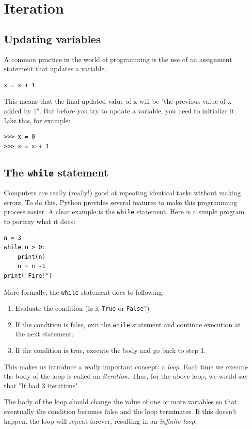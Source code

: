 \section{Iteration}
\subsection{Updating variables}
A common practice in the world of programming is the use of an assignment statement that updates a variable.
\begin{verbatim}
x = x + 1
\end{verbatim}

This means that the final updated value of x will be "the previous value of x added by 1". But before you try to update a variable, you need to initialize it. Like this, for example:
\begin{verbatim}
>>> x = 0
>>> x = x + 1
\end{verbatim}

\subsection{The \texttt{while} statement}
Computers are really (really!) good at repeating identical tasks without making errors. To do this, Python provides several features to make this programming process easier. A clear example is the \texttt{while} statement. Here is a simple program to portray what it does:
\begin{verbatim}
n = 3
while n > 0:
    print(n)
    n = n -1
print("Fire!")
\end{verbatim}

More formally, the \texttt{while} statement does te following:
\begin{enumerate}
    \item Evaluate the condition (Is it \texttt{True} or \texttt{False}?)
    \item If the condition is false, exit the \texttt{while} statement and continue execution at the next statement.
    \item If the condition is true, execute the body and go back to step 1. 
\end{enumerate}

This makes us introduce a really important concept: a \textit{loop}. Each time we execute the body of the loop is called an \textit{iteration}. Thus, for the above loop, we would say that "It had 3 iterations". 

The body of the loop should change the value of one or more variables so that eventually the condition becomes false and the loop terminates. If this doesn't happen, the loop will repeat forever, resulting in an \textit{infinite loop}.

